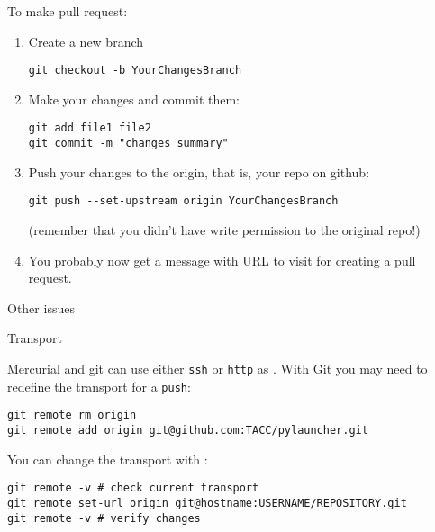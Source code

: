 To make pull request:
\begin{enumerate}
\item Create a new branch
\begin{verbatim}
git checkout -b YourChangesBranch
\end{verbatim}
\item 
  Make your changes and commit them:
\begin{verbatim}
git add file1 file2
git commit -m "changes summary"
\end{verbatim}
\item Push your changes to the origin, that is,
  your repo on github:
\begin{verbatim}
git push --set-upstream origin YourChangesBranch
\end{verbatim}
(remember that you didn't have write permission to the original repo!)
\item You probably now get a message with URL to visit for creating
  a pull request.
\end{enumerate}


 {Other issues}

 {Transport}

Mercurial and git can use either \texttt{ssh} or \texttt{http} as
%
%
.
With Git you may need to redefine the transport for a \texttt{push}:
\begin{verbatim}
git remote rm origin
git remote add origin git@github.com:TACC/pylauncher.git
\end{verbatim}

You can change the transport with :
\begin{verbatim}
git remote -v # check current transport
git remote set-url origin git@hostname:USERNAME/REPOSITORY.git
git remote -v # verify changes
\end{verbatim}

\endinput

$ git config --global user.name "Vlad Dracula"
$ git config --global user.email "vlad@tran.sylvan.ia"

git config --global init.defaultBranch main





